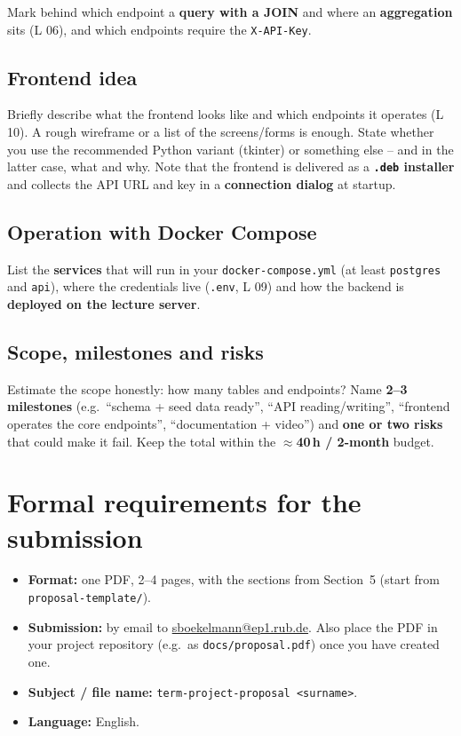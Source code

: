\documentclass[11pt,a4paper]{article}
\begin{document}
Mark behind which endpoint a \textbf{query with a JOIN} and where an
\textbf{aggregation} sits (L 06), and which endpoints require the
\texttt{X-API-Key}.

\subsection{Frontend idea}

Briefly describe what the frontend looks like and which endpoints it operates
(L 10). A rough wireframe or a list of the screens/forms is enough. State
whether you use the recommended Python variant (tkinter) or something else --
and in the latter case, what and why. Note that the frontend is delivered as a
\textbf{\texttt{.deb} installer} and collects the API URL and key in a
\textbf{connection dialog} at startup.

\subsection{Operation with Docker Compose}

List the \textbf{services} that will run in your \texttt{docker-compose.yml} (at
least \texttt{postgres} and \texttt{api}), where the credentials live
(\texttt{.env}, L 09) and how the backend is \textbf{deployed on the lecture
server}.

\subsection{Scope, milestones and risks}

Estimate the scope honestly: how many tables and endpoints? Name \textbf{2--3
milestones} (e.g.\ ``schema + seed data ready'', ``API reading/writing'',
``frontend operates the core endpoints'', ``documentation + video'') and
\textbf{one or two risks} that could make it fail. Keep the total within the
\textbf{$\approx$40\,h / 2-month} budget.

\section{Formal requirements for the submission}

\begin{itemize}[leftmargin=1.4em]
  \item \textbf{Format:} one PDF, 2--4 pages, with the sections from
        Section~5 (start from \texttt{proposal-template/}).
  \item \textbf{Submission:} by email to
        \href{mailto:sboekelmann@ep1.rub.de}{sboekelmann@ep1.rub.de}. Also place
        the PDF in your project repository (e.g.\ as \texttt{docs/proposal.pdf})
        once you have created one.
  \item \textbf{Subject / file name:} \texttt{term-project-proposal
        <surname>}.
  \item \textbf{Language:} English.
\end{itemize}
\end{document}
